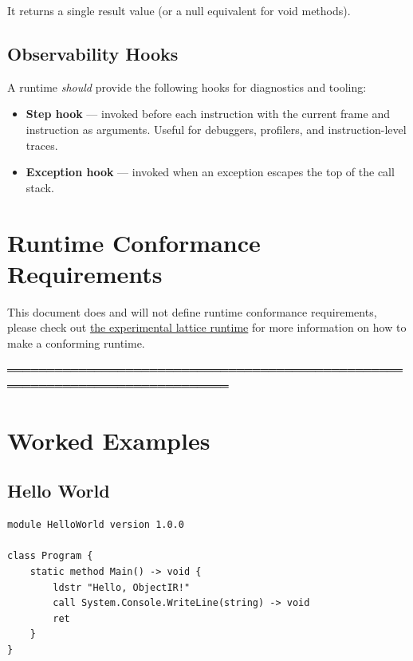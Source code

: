 \documentclass[11pt,a4paper]{article}
\begin{document}
It returns a single result value (or a null equivalent for void methods).

\subsection{Observability Hooks}

A runtime \textit{should} provide the following hooks for diagnostics and
tooling:

\begin{itemize}[leftmargin=1.8em]
  \item \textbf{Step hook} --- invoked before each instruction with the
    current frame and instruction as arguments. Useful for debuggers,
    profilers, and instruction-level traces.
  \item \textbf{Exception hook} --- invoked when an exception escapes the
    top of the call stack.
\end{itemize}

\section{Runtime Conformance Requirements}
\label{sec:conformance}

This document does and will not define runtime conformance requirements,
please check out \href{https://git.finite.ovh/Lattice}{the experimental lattice runtime} for more information on how
to make a conforming runtime.



 ══════════════════════════════════════════════════════════════════════════════
\section{Worked Examples}

\subsection{Hello World}

\begin{lstlisting}[style=textir, caption={Hello World in TextIR}]
module HelloWorld version 1.0.0

class Program {
    static method Main() -> void {
        ldstr "Hello, ObjectIR!"
        call System.Console.WriteLine(string) -> void
        ret
    }
}
\end{lstlisting}
\end{document}
